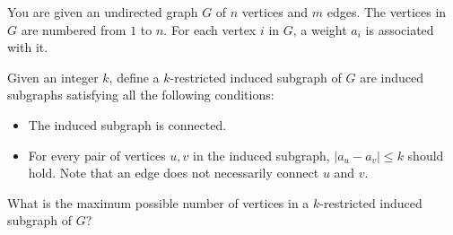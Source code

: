 You are given an undirected graph $G$ of $n$ vertices and $m$ edges.
The vertices in $G$ are numbered from $1$ to $n$. For each vertex $i$ in $G$, a weight $a_i$ is associated with it.

Given an integer $k$, define a $k$-restricted induced subgraph of $G$ are induced subgraphs satisfying all the following conditions:
\begin{itemize}
\item The induced subgraph is connected.
\item For every pair of vertices $u,v$ in the induced subgraph, $|a_u - a_v| \leq k$ should hold. Note that an edge does not necessarily connect $u$ and $v$.
\end{itemize}
What is the maximum possible number of vertices in a $k$-restricted induced subgraph of $G$?